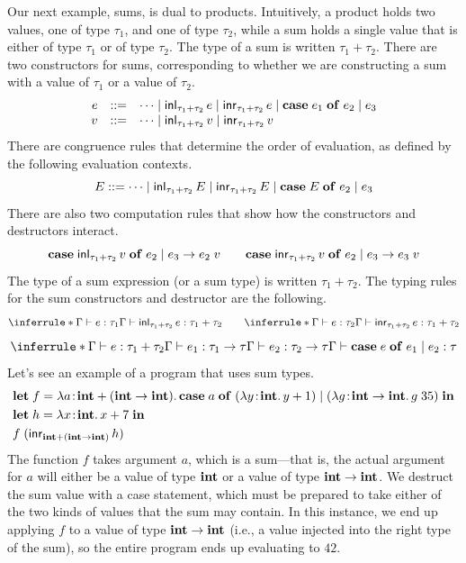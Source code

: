 Our next example, sums, is dual to products. Intuitively, a product holds two values, one of type $\tau_1$, and one of type $\tau_2$, while a sum holds a single value that is either of type $\tau_1$ or of type $\tau_2$. The type of a sum is written $\tau_1 + \tau_2$. There are two constructors for sums, corresponding to whether we are constructing a sum with a value of $\tau_1$ or a value of $\tau_2$.
\[
\begin{array}{rcl}
e & ::= & \cdots \mid \mathsf{inl}_{\tau_1+\tau_2}\, e \mid \mathsf{inr}_{\tau_1+\tau_2}\, e \mid \mathbf{case}\; e_1\; \mathbf{of}\; e_2 \mid e_3 \\
v & ::= & \cdots \mid \mathsf{inl}_{\tau_1+\tau_2}\, v \mid \mathsf{inr}_{\tau_1+\tau_2}\, v
\end{array}
\]
There are congruence rules that determine the order of evaluation, as defined by the following evaluation contexts.
\[
E ::= \cdots \mid \mathsf{inl}_{\tau_1+\tau_2}\, E \mid \mathsf{inr}_{\tau_1+\tau_2}\, E \mid \mathbf{case}\; E\; \mathbf{of}\; e_2 \mid e_3
\]
There are also two computation rules that show how the constructors and destructors interact.
\[
\mathbf{case}\; \mathsf{inl}_{\tau_1+\tau_2}\, v\; \mathbf{of}\; e_2 \mid e_3 \to e_2\; v
\qquad
\mathbf{case}\; \mathsf{inr}_{\tau_1+\tau_2}\, v\; \mathbf{of}\; e_2 \mid e_3 \to e_3\; v
\]
The type of a sum expression (or a sum type) is written $\tau_1 + \tau_2$. The typing rules for the sum constructors and destructor are the following.
\[
\inferrule*{\Gamma \vdash e : \tau_1}{\Gamma \vdash \inl_{\tau_1+\tau_2}\, e : \tau_1 + \tau_2}
\qquad
\inferrule*{\Gamma \vdash e : \tau_2}{\Gamma \vdash \inr_{\tau_1+\tau_2}\, e : \tau_1 + \tau_2}
\]
\[
\inferrule*{\Gamma \vdash e : \tau_1 + \tau_2 \\ \Gamma \vdash e_1 : \tau_1 \to \tau \\ \Gamma \vdash e_2 : \tau_2 \to \tau}{\Gamma \vdash \kw{case}\; e\; \kw{of}\; e_1 \mid e_2 : \tau}
\]
Let's see an example of a program that uses sum types.
\begin{align*}
&\kw{let}\; f = \lam{a}{\tint + (\tint \to \tint)} \kw{case}\; a\; \kw{of}\; (\lam{y}{\tint} y + 1) \mid (\lam{g}{\tint \to \tint} g\; 35)\; \kw{in} \\
&\kw{let}\; h = \lam{x}{\tint} x + 7\; \kw{in} \\
&f\; (\inr_{\tint + (\tint \to \tint)}\, h)
\end{align*}
The function $f$ takes argument $a$, which is a sum---that is, the actual argument for $a$ will either be a value of type $\mathbf{int}$ or a value of type $\mathbf{int} \to \mathbf{int}$. We destruct the sum value with a case statement, which must be prepared to take either of the two kinds of values that the sum may contain. In this instance, we end up applying $f$ to a value of type $\mathbf{int} \to \mathbf{int}$ (i.e., a value injected into the right type of the sum), so the entire program ends up evaluating to $42$.


